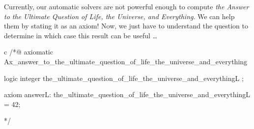 










Currently, our automatic solvers are not
powerful enough to compute \emph{the Answer to the Ultimate
  Question of Life, the Universe, and Everything}. We can help
them by stating it as an axiom! Now, we just have to
understand the question to determine in which case this result can be
useful \ldots{}


\begin{CodeBlock}{c}
/*@
  axiomatic Ax_answer_to_the_ultimate_question_of_life_the_universe_and_everything {
    logic integer the_ultimate_question_of_life_the_universe_and_everything{L} ;

    axiom answer{L}:
      the_ultimate_question_of_life_the_universe_and_everything{L} = 42;
  }
*/
\end{CodeBlock}




